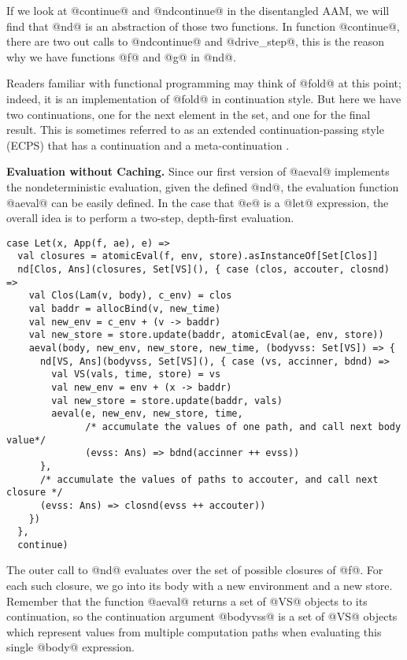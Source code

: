 \documentclass[acmsmall,review,anonymous]{acmart}\settopmatter{printfolios=true,printccs=false,printacmref=false}
\begin{document}
If we look at @continue@ and @ndcontinue@ in the disentangled AAM, we will find
that @nd@ is an abstraction of those two functions. In function @continue@,
there are two out calls to @ndcontinue@ and @drive_step@, this is the reason why
we have functions @f@ and @g@ in @nd@.

Readers familiar with functional programming may think of @fold@ at this point; indeed,
it is an implementation of @fold@ in continuation style. But here we have two
continuations, one for the next element in the set, and one for the final result.
This is sometimes referred to as an extended continuation-passing style (ECPS)
that has a continuation and a meta-continuation \cite{Danvy:1990:AC:91556.91622}.

\textbf{Evaluation without Caching.}
Since our first version of @aeval@ implements the nondeterministic
evaluation, given the defined @nd@, the evaluation function @aeval@ can be easily
defined. In the case that @e@ is a @let@ expression,
the overall idea is to perform a two-step, depth-first evaluation. 

\begin{lstlisting}
case Let(x, App(f, ae), e) =>
  val closures = atomicEval(f, env, store).asInstanceOf[Set[Clos]]
  nd[Clos, Ans](closures, Set[VS](), { case (clos, accouter, closnd) =>
    val Clos(Lam(v, body), c_env) = clos
    val baddr = allocBind(v, new_time)
    val new_env = c_env + (v -> baddr)
    val new_store = store.update(baddr, atomicEval(ae, env, store))
    aeval(body, new_env, new_store, new_time, (bodyvss: Set[VS]) => {
      nd[VS, Ans](bodyvss, Set[VS](), { case (vs, accinner, bdnd) =>
        val VS(vals, time, store) = vs
        val new_env = env + (x -> baddr)
        val new_store = store.update(baddr, vals)
        aeval(e, new_env, new_store, time,
              /* accumulate the values of one path, and call next body value*/
              (evss: Ans) => bdnd(accinner ++ evss))
      },
      /* accumulate the values of paths to accouter, and call next closure */
      (evss: Ans) => closnd(evss ++ accouter))
    })
  },
  continue)
\end{lstlisting}

The outer call to @nd@ evaluates over the set of possible closures of
@f@. For each such closure, we go into its body with a new environment and a new store.
Remember that the function @aeval@ returns a set of @VS@ objects to its continuation,
so the continuation argument @bodyvss@ is a set of @VS@ objects which represent values
from multiple computation paths when evaluating this single @body@ expression.
\end{document}
